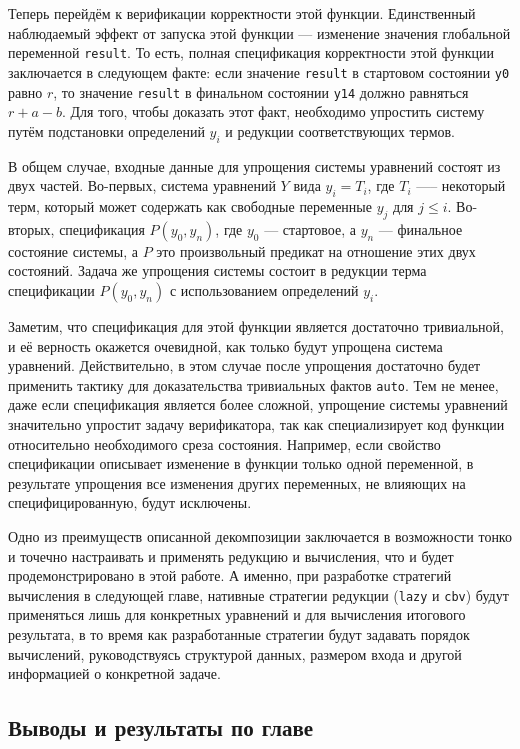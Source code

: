 \documentclass[../diploma.tex]{subfiles}
\begin{document}
Теперь перейдём к верификации корректности этой функции. Единственный наблюдаемый эффект от запуска этой функции --- изменение значения глобальной переменной \texttt{result}. То есть, полная спецификация корректности этой функции заключается в следующем факте: если значение \texttt{result} в стартовом состоянии \texttt{y0} равно $r$, то значение \texttt{result} в финальном состоянии \texttt{y14} должно равняться $r + a - b$. Для того, чтобы доказать этот факт, необходимо упростить систему путём подстановки определений $y_i$ и редукции соответствующих термов.

В общем случае, входные данные для упрощения системы уравнений состоят из двух частей. Во-первых, система уравнений $Y$ вида $y_i = T_i$, где $T_i$ —-- некоторый терм, который может содержать как свободные переменные $y_j$ для $j \le i$. Во-вторых, спецификация $P(y_0, y_n)$, где $y_0$ --- стартовое, а $y_n$ --- финальное состояние системы, а $P$ это произвольный предикат на отношение этих двух состояний. Задача же упрощения системы состоит в редукции терма спецификации $P(y_0, y_n)$ с использованием определений $y_i$.

Заметим, что спецификация для этой функции является достаточно тривиальной, и её верность окажется очевидной, как только будут упрощена система уравнений. Действительно, в этом случае после упрощения достаточно будет применить тактику для доказательства тривиальных фактов \texttt{auto}. Тем не менее, даже если спецификация является более сложной, упрощение системы уравнений значительно упростит задачу верификатора, так как специализирует код функции относительно необходимого среза состояния. Например, если свойство спецификации описывает изменение в функции только одной переменной, в результате упрощения все изменения других переменных, не влияющих на специфицированную, будут исключены.

Одно из преимуществ описанной декомпозиции заключается в возможности тонко и точечно настраивать и применять редукцию и вычисления, что и будет продемонстрировано в этой работе. А именно, при разработке стратегий вычисления в следующей главе, нативные стратегии редукции (\texttt{lazy} и \texttt{cbv}) будут применяться лишь для конкретных уравнений и для вычисления итогового результата, в то время как разработанные стратегии будут задавать порядок вычислений, руководствуясь структурой данных, размером входа и другой информацией о конкретной задаче.

\subsection{Выводы и результаты по главе}
\end{document}

